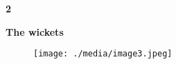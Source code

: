 \documentclass[12pt]{article}
\begin{document}
\vspace{\baselineskip}

\vspace{\baselineskip}

\vspace{\baselineskip}

\vspace{\baselineskip}

\vspace{\baselineskip}

\vspace{\baselineskip}

\vspace{\baselineskip}

\vspace{\baselineskip}

\vspace{\baselineskip}

\vspace{\baselineskip}

\vspace{\baselineskip}

\vspace{\baselineskip}

\vspace{\baselineskip}
\begin{Center}
{\fontsize{8pt}{9.6pt}\par}
\end{Center}\par


\vspace{\baselineskip}
{\fontsize{16pt}{19.2pt}\selectfont \textbf{2 \tabto{0.29in} }{\fontsize{15pt}{18.0pt}\selectfont \textbf{The wickets}\par}\par}\par




\begin{figure}[H]
\advance\leftskip 2.01in		\texttt{[image: ./media/image3.jpeg]}
\end{figure}



\par


\vspace{\baselineskip}
\end{document}
